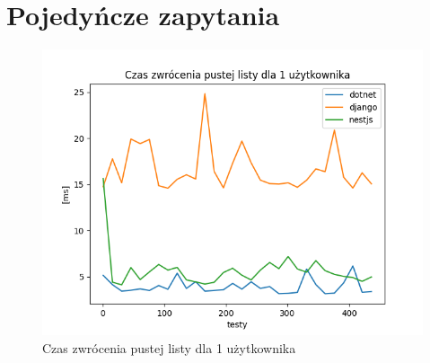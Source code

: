 \section{Pojedyńcze zapytania}

\begin{figure}[!hb]
	\centering \includegraphics[width=1\linewidth]{rysunki/Request_duration_for_1_user.png}
	\caption{Czas zwrócenia pustej listy dla 1 użytkownika}
	\label{rys:request_duration_for_1_user}
\end{figure}